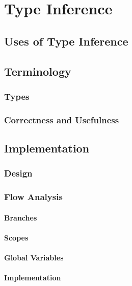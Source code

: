 \documentclass[12pt,halfparskip]{scrreprt}
\begin{document}
\chapter{Type Inference}


\section{Uses of Type Inference}


\section{Terminology}

\subsection{Types}


\subsection{Correctness and Usefulness}


\section{Implementation}


\subsection{Design}


\subsection{Flow Analysis}

\subsubsection{Branches}


\subsubsection{Scopes}


\subsubsection{Global Variables}


\subsubsection{Implementation}
\end{document}
